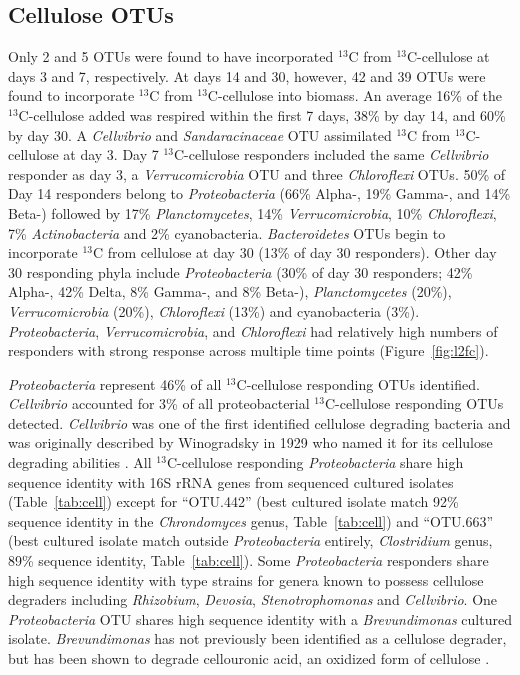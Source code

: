 \subsection{Cellulose OTUs}
Only 2 and 5 OTUs were found to have incorporated $^{13}$C from
$^{13}$C-cellulose at days 3 and 7, respectively. At days 14 and 30, however,
42 and 39 OTUs were found to incorporate $^{13}$C from $^{13}$C-cellulose into
biomass. An average 16\% of the $^{13}$C-cellulose added was respired within
the first 7 days, 38\% by day 14, and 60\% by day 30.  A \textit{Cellvibrio}
and \textit{Sandaracinaceae} OTU assimilated $^{13}$C from $^{13}$C-cellulose
at day 3. Day 7 $^{13}$C-cellulose responders included the same
\textit{Cellvibrio} responder as day 3, a \textit{Verrucomicrobia} OTU and
three \textit{Chloroflexi} OTUs.  50\% of Day 14 responders belong to
\textit{Proteobacteria} (66\% Alpha-, 19\% Gamma-, and 14\% Beta-) followed by
17\% \textit{Planctomycetes}, 14\% \textit{Verrucomicrobia}, 10\%
\textit{Chloroflexi}, 7\% \textit{Actinobacteria} and 2\% cyanobacteria.
\textit{Bacteroidetes} OTUs begin to incorporate $^{13}$C from cellulose at day
30 (13\% of day 30 responders). Other day 30 responding phyla include
\textit{Proteobacteria} (30\% of day 30 responders; 42\% Alpha-, 42\% Delta,
8\% Gamma-, and 8\% Beta-), \textit{Planctomycetes} (20\%),
\textit{Verrucomicrobia} (20\%), \textit{Chloroflexi} (13\%) and cyanobacteria
(3\%). \textit{Proteobacteria}, \textit{Verrucomicrobia}, and
\textit{Chloroflexi} had relatively high numbers of responders with strong
response across multiple time points (Figure~\ref{fig:l2fc}).

\textit{Proteobacteria} represent 46\% of all $^{13}$C-cellulose responding
OTUs identified. \textit{Cellvibrio} accounted for 3\% of all proteobacterial
$^{13}$C-cellulose responding OTUs detected. \textit{Cellvibrio} was one of the
first identified cellulose degrading bacteria and was originally described by
Winogradsky in 1929 who named it for its cellulose degrading abilities
\citep{boone2001bergeys}. All $^{13}$C-cellulose responding
\textit{Proteobacteria} share high sequence identity with 16S rRNA genes from
sequenced cultured isolates (Table~\ref{tab:cell}) except for ``OTU.442'' (best
cultured isolate match 92\% sequence identity in the \textit{Chrondomyces}
genus, Table~\ref{tab:cell}) and ``OTU.663'' (best cultured isolate match
outside \textit{Proteobacteria} entirely, \textit{Clostridium} genus, 89\%
sequence identity, Table~\ref{tab:cell}). Some \textit{Proteobacteria}
responders share high sequence identity with type strains for genera known to
possess cellulose degraders including \textit{Rhizobium}, \textit{Devosia},
\textit{Stenotrophomonas} and \textit{Cellvibrio}. One \textit{Proteobacteria}
OTU shares high sequence identity with a \textit{Brevundimonas} cultured
isolate.  \textit{Brevundimonas} has not previously been identified as a
cellulose degrader, but has been shown to degrade cellouronic acid, an oxidized
form of cellulose \citep{Tavernier_2008}.

